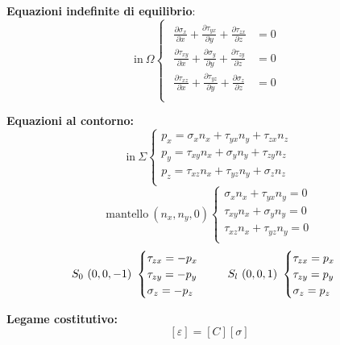	\textbf{Equazioni indefinite di equilibrio}:
\[ \text{in} ~ \Omega
\begin{cases}
	\begin{aligned}
		\frac{\partial\sigma_x}{\partial x} + \frac{\partial \tau_{yx}}{\partial y} + \frac{\partial \tau_{zx}}{\partial z} & =0 \\
		
		\frac{\partial \tau_{xy}}{\partial x} + \frac{\partial\sigma_y}{\partial y} + \frac{\partial \tau_{zy}}{\partial z} & =0 \\
		
		\frac{\partial \tau_{xz}}{\partial x} + \frac{\partial \tau_{yz}}{\partial y} + \frac{\partial\sigma_z}{\partial z} & =0 \\
	\end{aligned}
\end{cases}
\]

	\textbf{Equazioni al contorno:} 
\[
\text{in} ~ \Sigma \begin{cases}
	p_x = \sigma_x n_x + \tau_{yx}n_y + \tau_{zx}n_z \\
	p_y = \tau_{xy}n_x + \sigma_y n_y + \tau_{zy}n_z \\
	p_z = \tau_{xz}n_x + \tau_{yz}n_y + \sigma_z n_z \\
\end{cases}
\]
\[
\text{mantello} ~ (n_x,n_y,0) \begin{cases}
\sigma_x n_x + \tau_{yx}n_y =0 \\
\tau_{xy}n_x + \sigma_y n_y =0 \\
\tau_{xz}n_x + \tau_{yz}n_y =0 \\
\end{cases} 
\]
\[
\text{$S_0$} ~ (0,0,-1) ~ \begin{cases}
	\tau_{zx} = -p_x \\
	\tau_{zy} = -p_y \\
	\sigma_z = -p_z \\
\end{cases}
\hspace{0.5cm}
\text{$S_l$} ~ (0,0,1) ~ \begin{cases}
	\tau_{zx} = p_x \\
	\tau_{zy} = p_y \\
	\sigma_z = p_z \\
\end{cases}
\]

\textbf{Legame costitutivo:}
\[ [\varepsilon] = [C][\sigma]\]

